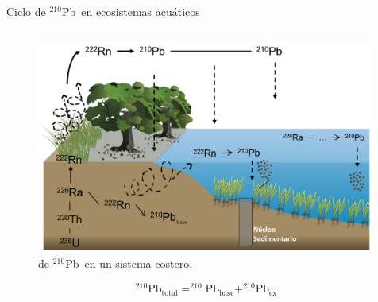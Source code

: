 \documentclass[9pt]{beamer}
\newcommand{\PbCero}{$^{210}$Pb}
\begin{document}
\begin{frame}{Ciclo de \PbCero\, en ecosistemas acuáticos}
	\begin{columns}
		\begin{column}{0.7 \textwidth}
			\justifying
			\begin{figure}
				\centering
				\includegraphics[width=0.99\textwidth]{Imagenes/Ciclo210PbAcuatico.png}
				\caption{\hyperlink{Ciclo}{} de \PbCero\, en un sistema costero\footnotemark[1].}\label{Fig-Ciclo210Pb}
			\end{figure}
			\begin{equation}
						^{210}\text{Pb}_\text{total} =  ^{210}\text{Pb}_\text{base} + ^{210}\text{Pb}_\text{ex} 
			\end{equation}


\end{column}
\end{columns}
\end{frame}
\end{document}
